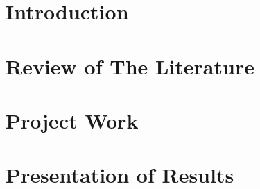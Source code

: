 
\part{Introduction} %


\cleardoublepage %


\ctparttext{} %

\part{Review of The Literature}%

%
% 
% 
%
%






\cleardoublepage %


\part{Project Work} %




\cleardoublepage



\part{Presentation of Results}




